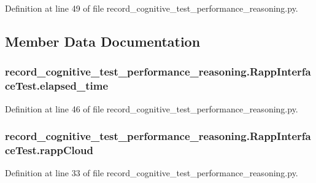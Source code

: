 Definition at line 49 of file record\-\_\-cognitive\-\_\-test\-\_\-performance\-\_\-reasoning.\-py.



\subsection{Member Data Documentation}
\hypertarget{classrecord__cognitive__test__performance__reasoning_1_1RappInterfaceTest_a20b3ffdfc6f9744f693adf367c23e087}{
\subsubsection[{elapsed\-\_\-time}]{\setlength{\rightskip}{0pt plus 5cm}record\-\_\-cognitive\-\_\-test\-\_\-performance\-\_\-reasoning.\-Rapp\-Interface\-Test.\-elapsed\-\_\-time}}\label{classrecord__cognitive__test__performance__reasoning_1_1RappInterfaceTest_a20b3ffdfc6f9744f693adf367c23e087}


Definition at line 46 of file record\-\_\-cognitive\-\_\-test\-\_\-performance\-\_\-reasoning.\-py.

\hypertarget{classrecord__cognitive__test__performance__reasoning_1_1RappInterfaceTest_a72b0e1ff0c0d960b487623c38ed415b7}{
\subsubsection[{rapp\-Cloud}]{\setlength{\rightskip}{0pt plus 5cm}record\-\_\-cognitive\-\_\-test\-\_\-performance\-\_\-reasoning.\-Rapp\-Interface\-Test.\-rapp\-Cloud}}\label{classrecord__cognitive__test__performance__reasoning_1_1RappInterfaceTest_a72b0e1ff0c0d960b487623c38ed415b7}


Definition at line 33 of file record\-\_\-cognitive\-\_\-test\-\_\-performance\-\_\-reasoning.\-py.

